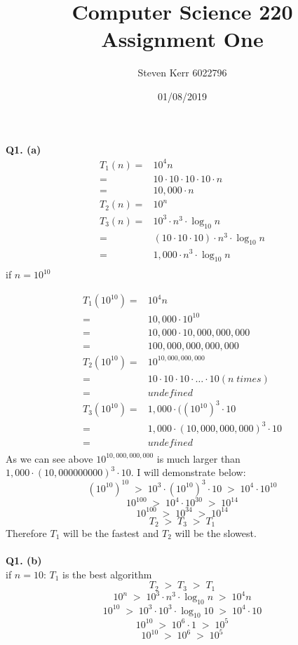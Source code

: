 \documentclass[a4paper,12pt]{article}
\title{Computer Science 220 \\
\large Assignment One}
\author{Steven Kerr 6022796}
\date{01/08/2019}
\begin{document}
\maketitle

\noindent \textbf{Q1. (a)}
\begin{equation}
\begin{split}
T_1(n)={}& 10^4n \\
		={}& 10 \cdot 10 \cdot 10 \cdot 10 \cdot n \\
		={}& 10,000 \cdot n \\
T_2(n)={}& 10^n \\
T_3(n)={}& 10^3 \cdot n^3 \cdot  \log_{10} n\\
		={}& (10 \cdot 10 \cdot 10) \cdot n^3 \cdot \log_{10} n\\
		={}& 1,000 \cdot n^3 \cdot \log_{10} n \\
\end{split}
\end{equation}
if $n=10^{10}$

\begin{equation}
\begin{split}
T_1(10^{10})={}& 10^4n \\
		={}& 10,000 \cdot 10^{10} \\
		={}& 10,000 \cdot 10,000,000,000 \\
		={}& 100,000,000,000,000 \\
T_2(10^{10})={}& 10^{10,000,000,000} \\
		={}& 10 \cdot 10 \cdot 10 \cdot \dotsc \cdot 10 (n\; times)\\
		={}& undefined \\
T_3(10^{10})={}& 1,000 \cdot ((10^{10})^3 \cdot 10\\
		={}& 1,000 \cdot (10,000,000,000)^3 \cdot 10\\
		={}& undefined\\
\end{split}
\end{equation}
\newpage
As we can see above $10^{10,000,000,000}$ is much larger than $1,000 \cdot (10,000000000)^3 \cdot 10$. I will demonstrate below:
$$(10^{10})^{10} \; > \; 10^3 \cdot (10^{10})^3 \cdot 10 \; > \; 10^4 \cdot 10^{10}$$
$$10^{100} \; > \; 10^4 \cdot 10^{30} \; > \; 10^{14}$$
$$10^{100} \; > \; 10^{34} \; > \; 10^{14}$$
$$T_2 \; > \; T_3 \; > \; T_1$$
Therefore $T_1$ will be the fastest and $T_2$ will be the slowest.\\
\\
\noindent \textbf{Q1. (b)}\\
if $n=10$: $T_1$ is the best algorithm
$$ T_2 \; > \; T_3 \; > \; T_1$$
$$ 10^{n} \; > \; 10^3 \cdot n^3 \cdot  \log_{10} n \; > \; 10^4n $$
$$ 10^{10} \; > \; 10^3 \cdot 10^3 \cdot  \log_{10} 10 \; > \; 10^4 \cdot 10 $$
$$ 10^{10} \; > \; 10^6 \cdot 1 \; > \; 10^5 $$
$$ 10^{10} \; > \; 10^6 \; > \; 10^5 $$
\end{document}
